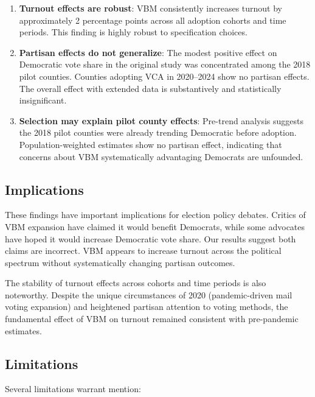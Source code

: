 \documentclass[12pt]{article}
\begin{document}
\begin{enumerate}
    \item \textbf{Turnout effects are robust}: VBM consistently increases turnout by approximately 2 percentage points across all adoption cohorts and time periods. This finding is highly robust to specification choices.

    \item \textbf{Partisan effects do not generalize}: The modest positive effect on Democratic vote share in the original study was concentrated among the 2018 pilot counties. Counties adopting VCA in 2020--2024 show no partisan effects. The overall effect with extended data is substantively and statistically insignificant.

    \item \textbf{Selection may explain pilot county effects}: Pre-trend analysis suggests the 2018 pilot counties were already trending Democratic before adoption. Population-weighted estimates show no partisan effect, indicating that concerns about VBM systematically advantaging Democrats are unfounded.
\end{enumerate}

\subsection{Implications}

These findings have important implications for election policy debates. Critics of VBM expansion have claimed it would benefit Democrats, while some advocates have hoped it would increase Democratic vote share. Our results suggest both claims are incorrect. VBM appears to increase turnout across the political spectrum without systematically changing partisan outcomes.

The stability of turnout effects across cohorts and time periods is also noteworthy. Despite the unique circumstances of 2020 (pandemic-driven mail voting expansion) and heightened partisan attention to voting methods, the fundamental effect of VBM on turnout remained consistent with pre-pandemic estimates.

\subsection{Limitations}

Several limitations warrant mention:
\end{document}
